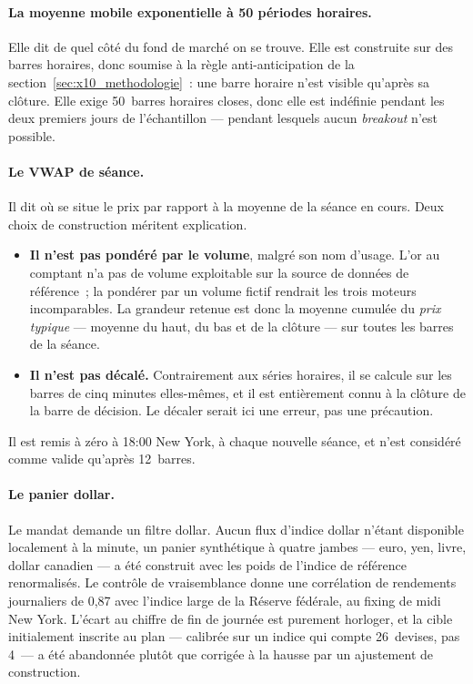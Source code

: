 \paragraph{La moyenne mobile exponentielle à 50 périodes horaires.}
Elle dit de quel côté du fond de marché on se trouve. Elle est construite sur
des barres horaires, donc soumise à la règle anti-anticipation de la
section~\ref{sec:x10_methodologie}~: une barre horaire n'est visible qu'après
sa clôture. Elle exige 50~barres horaires closes, donc elle est indéfinie
pendant les deux premiers jours de l'échantillon --- pendant lesquels aucun
\emph{breakout} n'est possible.

\paragraph{Le VWAP de séance.}
Il dit où se situe le prix par rapport à la moyenne de la séance en cours.
Deux choix de construction méritent explication.

\begin{itemize}
  \item \textbf{Il n'est pas pondéré par le volume}, malgré son nom d'usage.
  L'or au comptant n'a pas de volume exploitable sur la source de données de
  référence~; la pondérer par un volume fictif rendrait les trois moteurs
  incomparables. La grandeur retenue est donc la moyenne cumulée du
  \emph{prix typique} --- moyenne du haut, du bas et de la clôture --- sur
  toutes les barres de la séance.
  \item \textbf{Il n'est pas décalé.} Contrairement aux séries horaires, il se
  calcule sur les barres de cinq minutes elles-mêmes, et il est entièrement
  connu à la clôture de la barre de décision. Le décaler serait ici une
  erreur, pas une précaution.
\end{itemize}

Il est remis à zéro à 18:00 New York, à chaque nouvelle séance, et n'est
considéré comme valide qu'après 12~barres.

\paragraph{Le panier dollar.}
Le mandat demande un filtre dollar. Aucun flux d'indice dollar n'étant
disponible localement à la minute, un panier synthétique à quatre jambes ---
euro, yen, livre, dollar canadien --- a été construit avec les poids de
l'indice de référence renormalisés. Le contrôle de vraisemblance donne une
corrélation de rendements journaliers de 0,87 avec l'indice large de la
Réserve fédérale, au fixing de midi New York. L'écart au chiffre de fin de
journée est purement horloger, et la cible initialement inscrite au plan
--- calibrée sur un indice qui compte 26~devises, pas 4~--- a été abandonnée
plutôt que corrigée à la hausse par un ajustement de construction.

